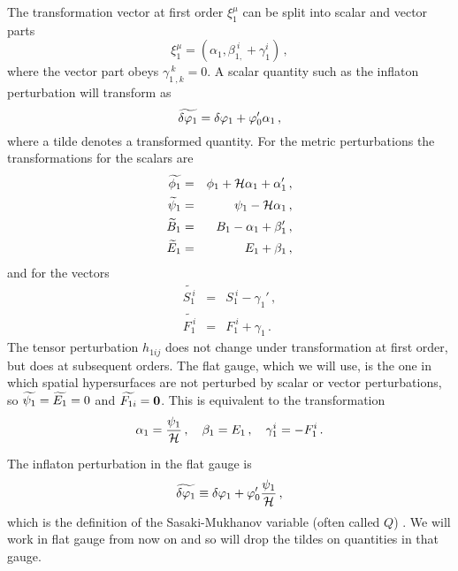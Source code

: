 The transformation vector at first order  $\xi_1^\mu$ can be split into scalar
and vector parts
% 
\begin{equation}
\label{eq:xidefn-intro}
 \xi_1^\mu = (\alpha_1, \beta_{1,}^{~i} + \gamma_1^i)\,,
\end{equation}
% 
where the vector part obeys $\gamma_{1~,k}^{~k}=0$. A scalar quantity such as
the inflaton perturbation will transform as \cite{Malik:2008im, Malik:2008yp}
% 
\begin{equation}
 \label{eq:dphitransform-intro}
 \widetilde{\delta\varphi_{1}} = \delta\varphi_{1} + \varphi_0' \alpha_1\,,
\end{equation}
where a tilde denotes a transformed quantity. For the metric perturbations the
transformations for the scalars are
\begin{eqnarray}
 \label{transphi1}
\widetilde {\phi_1} &=& \phi_1 +\H\alpha_1+\alpha_1'\,,\\
%
\label{transpsi1}
\widetilde \psi_1 &=& \psi_1-\H\alpha_1 \,,\\
%
\label{transB1}
\widetilde B_1 &=& B_1-\alpha_1+\beta_1'\,,\\
%
\label{transE1}
\widetilde E_1 &=& E_1+\beta_1\,,
\end{eqnarray}
and for the vectors
\begin{eqnarray}
 \label{transS1}
\widetilde {S_{1}^{~i}} &=& S_{1}^{~i}-\gamma_1'\,, \\
%
\label{transF1}
\widetilde {F_{1}^{~i}} &=& F_{1}^{~i}+\gamma_1\,. 
\end{eqnarray}
% 
The tensor perturbation $h_{1ij}$ does not change under transformation at first
order, but does at subsequent orders.
The flat gauge, which we will use, is the one in which spatial hypersurfaces
are not perturbed by scalar or vector perturbations, so $\widetilde{\psi_1} = \widetilde{E_1}
=0$ and $\widetilde{F_{1i}} = \textbf{0}$.  This is equivalent to the transformation
% 
\begin{equation}
 \alpha_1 = \frac{\psi_1}{\mathcal{H}}\,,\quad \beta_1=E_1 \,, \quad \gamma^i_1 =
-F^i_1\,.
\end{equation}

The inflaton perturbation in the flat gauge is
% 
\begin{equation}
\label{eq:flatdvp1-intro}
 \widetilde{\delta\varphi_{1}} \equiv \delta\varphi_{1} + \varphi_0'\frac{\psi_1}{\mathcal{H}}\,,
\end{equation}
% 
which is the definition of the Sasaki-Mukhanov variable
(often called $Q$) \cite{Mukhanov:1988jd,Sasaki:1986hm}. We will work in flat
gauge from now on and so will drop the tildes on quantities in that gauge.

